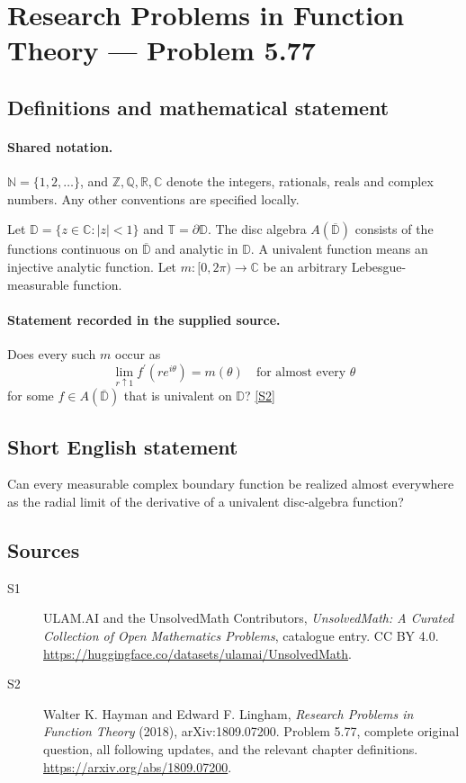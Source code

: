 \documentclass[11pt]{book}
\newcommand{\sref}[2]{\hyperlink{source:#1:#2}{[S#2]}}
\begin{document}
\section{Research Problems in Function Theory — Problem 5.77}\label{statement}

\subsection{Definitions and mathematical statement}

\paragraph{Shared notation.}$\mathbb N=\{1,2,\ldots\}$, and $\mathbb Z,\mathbb Q,\mathbb R,\mathbb C$ denote the integers, rationals, reals and complex numbers. Any other conventions are specified locally.


Let $\mathbb D=\{z\in\mathbb C:|z|<1\}$ and $\mathbb T=\partial\mathbb D$. The disc algebra $A(\overline{\mathbb D})$ consists of the functions continuous on $\overline{\mathbb D}$ and analytic in $\mathbb D$. A univalent function means an injective analytic function. Let $m:[0,2\pi)\to\mathbb C$ be an arbitrary Lebesgue-measurable function.
\paragraph{Statement recorded in the supplied source.}
Does every such $m$ occur as \[\lim_{r\uparrow1}f^{\prime}(re^{i\theta})=m(\theta)\quad\text{for almost every }\theta\] for some $f\in A(\overline{\mathbb D})$ that is univalent on $\mathbb D$? \sref{statement}{2}
\subsection{Short English statement}
Can every measurable complex boundary function be realized almost everywhere as the radial limit of the derivative of a univalent disc-algebra function?
\subsection{Sources}
\begin{description}
\item[\hypertarget{source:statement:1}{S1}] ULAM.AI and the UnsolvedMath Contributors, \emph{UnsolvedMath: A Curated Collection of Open Mathematics Problems}, catalogue entry. CC BY 4.0. \url{https://huggingface.co/datasets/ulamai/UnsolvedMath}.
\item[\hypertarget{source:statement:2}{S2}] Walter K. Hayman and Edward F. Lingham, \emph{Research Problems in Function Theory} (2018), arXiv:1809.07200. Problem 5.77, complete original question, all following updates, and the relevant chapter definitions. \url{https://arxiv.org/abs/1809.07200}.
\end{description}
\label{end:statement}
\end{document}
